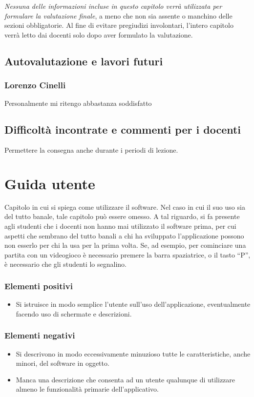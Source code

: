 \documentclass[a4paper,12pt]{report}
\begin{document}
\textit{Nessuna delle informazioni incluse in questo capitolo verrà utilizzata per formulare la valutazione finale}, a meno che non sia assente o manchino delle sezioni obbligatorie.
%
Al fine di evitare pregiudizi involontari, l'intero capitolo verrà letto dai docenti solo dopo aver formulato la valutazione.

\section{Autovalutazione e lavori futuri}

\subsection{Lorenzo Cinelli}

Personalmente mi ritengo abbastanza soddisfatto 

\section{Difficoltà incontrate e commenti per i docenti}

Permettere la consegna anche durante i periodi di lezione.

\appendix
\chapter{Guida utente}

Capitolo in cui si spiega come utilizzare il software. Nel caso in cui il suo uso sia del tutto
banale, tale capitolo può essere omesso.
%
A tal riguardo, si fa presente agli studenti che i docenti non hanno mai utilizzato il software
prima, per cui aspetti che sembrano del tutto banali a chi ha sviluppato l'applicazione possono non
esserlo per chi la usa per la prima volta.
%
Se, ad esempio, per cominciare una partita con un videogioco è necessario premere la barra
spaziatrice, o il tasto ``P'', è necessario che gli studenti lo segnalino.

\subsection*{Elementi positivi}

\begin{itemize}
 \item Si istruisce in modo semplice l'utente sull'uso dell'applicazione, eventualmente facendo uso di schermate e descrizioni.
\end{itemize}

\subsection*{Elementi negativi}
\begin{itemize}
 \item Si descrivono in modo eccessivamente minuzioso tutte le caratteristiche, anche minori, del software in oggetto.
 \item Manca una descrizione che consenta ad un utente qualunque di utilizzare almeno le funzionalità primarie dell'applicativo.
\end{itemize}



\end{document}
